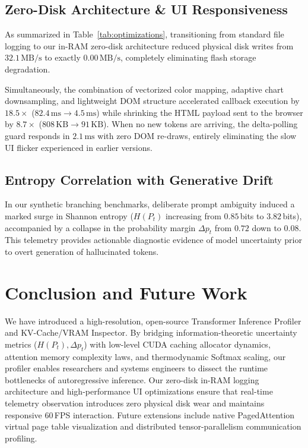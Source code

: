 \documentclass[10pt,twocolumn]{article}
\begin{document}
\subsection{Zero-Disk Architecture \& UI Responsiveness}
As summarized in Table~\ref{tab:optimizations}, transitioning from standard file logging to our in-RAM zero-disk architecture reduced physical disk writes from $32.1\,\text{MB/s}$ to exactly $0.00\,\text{MB/s}$, completely eliminating flash storage degradation.

Simultaneously, the combination of vectorized color mapping, adaptive chart downsampling, and lightweight DOM structure accelerated callback execution by $18.5\times$ ($82.4\,\text{ms} \to 4.5\,\text{ms}$) while shrinking the HTML payload sent to the browser by $8.7\times$ ($808\,\text{KB} \to 91\,\text{KB}$). When no new tokens are arriving, the delta-polling guard responds in $2.1\,\text{ms}$ with zero DOM re-draws, entirely eliminating the slow UI flicker experienced in earlier versions.

\subsection{Entropy Correlation with Generative Drift}
In our synthetic branching benchmarks, deliberate prompt ambiguity induced a marked surge in Shannon entropy ($H(P_t)$ increasing from $0.85$\,bits to $3.82$\,bits), accompanied by a collapse in the probability margin $\Delta p_t$ from $0.72$ down to $0.08$. This telemetry provides actionable diagnostic evidence of model uncertainty prior to overt generation of hallucinated tokens.

\section{Conclusion and Future Work}
We have introduced a high-resolution, open-source Transformer Inference Profiler and KV-Cache/VRAM Inspector. By bridging information-theoretic uncertainty metrics ($H(P_t), \Delta p_t$) with low-level CUDA caching allocator dynamics, attention memory complexity laws, and thermodynamic Softmax scaling, our profiler enables researchers and systems engineers to dissect the runtime bottlenecks of autoregressive inference. Our zero-disk in-RAM logging architecture and high-performance UI optimizations ensure that real-time telemetry observation introduces zero physical disk wear and maintains responsive 60\,FPS interaction. Future extensions include native PagedAttention virtual page table visualization and distributed tensor-parallelism communication profiling.



\end{document}

